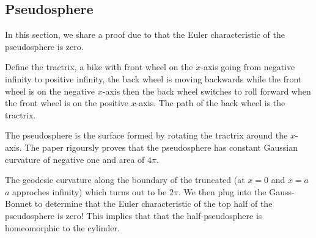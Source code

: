 \subsection{Pseudosphere}
\label{sec:pseudosphere}

In this section, we share a proof due to
\cite{pseudo-app} that the Euler characteristic of the pseudosphere
is zero.

Define the tractrix, a bike with front wheel on the $x$-axis going from negative infinity
to positive infinity, the back wheel is moving backwards while the front wheel is on the
negative $x$-axis then the back wheel switches to roll forward when the front wheel is
on the positive $x$-axis. The path of the back wheel is the tractrix.

The pseudosphere is the surface formed by rotating the tractrix around the $x$-axis.
The paper rigoursly proves that the pseudosphere has constant Gaussian curvature of
negative one and area of $4\pi$.

The geodesic curvature along the boundary of the truncated (at $x=0$ and $x=a$ $a$ approches
infinity) which turns out to be $2\pi$.
We then plug into the Gauss-Bonnet to determine that
the Euler characteristic of the top half of the pseudosphere is zero!
This implies that that the half-pseudosphere is homeomorphic to the cylinder.



